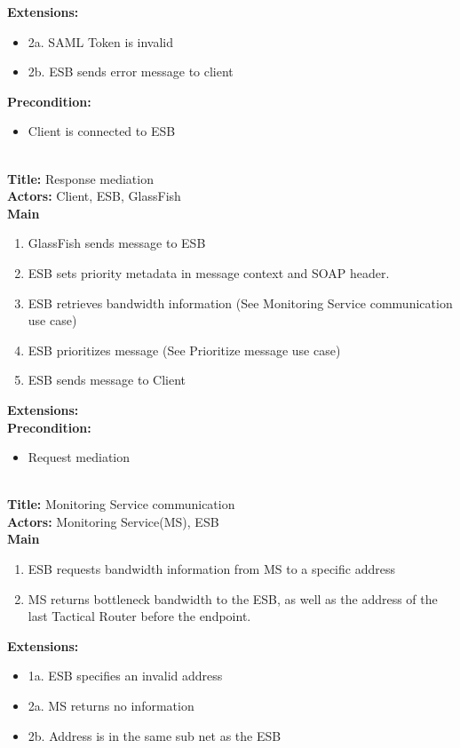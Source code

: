     \textbf{Extensions:}
    \begin{itemize}
        \item[] 2a. SAML Token is invalid
        \item[] 2b. ESB sends error message to client
    \end{itemize}
    \textbf{Precondition:}
    \begin{itemize}
        \item Client is connected to ESB
    \end{itemize}
    ~\\
    \textbf{Title:} Response mediation \\
    \textbf{Actors:} Client, ESB, GlassFish \\
    \textbf{Main}
    \begin{enumerate}
        \item GlassFish sends message to ESB
        \item ESB sets priority metadata in message context and SOAP header.
        \item ESB retrieves bandwidth information (See Monitoring Service communication use case)
        \item ESB prioritizes message (See Prioritize message use case)
        \item ESB sends message to Client
    \end{enumerate}
    \textbf{Extensions:} \\
    \textbf{Precondition:}
    \begin{itemize}
        \item Request mediation
    \end{itemize}
    ~\\
    \textbf{Title:} Monitoring Service communication\\
    \textbf{Actors:} Monitoring Service(MS), ESB\\
    \textbf{Main}
    \begin{enumerate}
        \item ESB requests bandwidth information from MS to a specific address
        \item MS returns bottleneck bandwidth to the ESB, as well as the address of the last Tactical Router before the endpoint.
    \end{enumerate}
    \textbf{Extensions:}
    \begin{itemize}
        \item[]	1a. ESB specifies an invalid address
        \item[]	2a. MS returns no information
        \item[]	2b. Address is in the same sub net as the ESB
    \end{itemize}
